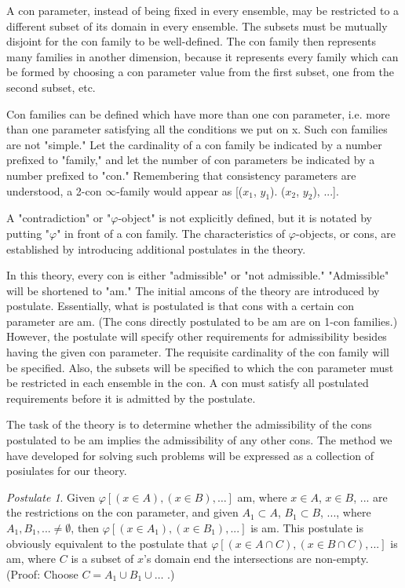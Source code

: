 \documentclass[10pt,twoside,draft]{memoir}
\newcommand{\postulate}[1]{
	\emph{Postulate #1}.}
\begin{document}
{{{{A con parameter, instead of being fixed in every ensemble, may be 
restricted to a different subset of its domain in every ensemble. The subsets 
must be mutually disjoint for the con family to be well-defined. The con 
family then represents many families in another dimension, because it 
represents every family which can be formed by choosing a con parameter 
value from the first subset, one from the second subset, etc. 

Con families can be defined which have more than one con parameter, 
i.e. more than one parameter satisfying all the conditions we put on x. Such 
con families are not "simple." Let the cardinality of a con family be 
indicated by a number prefixed to "family," and let the number of con 
parameters be indicated by a number prefixed to "con." Remembering that 
consistency parameters are understood, a 2-con $\infty$-family would appear as 
[($x_1$, $y_1$). ($x_2$, $y_2$), ...].

A "contradiction" or "$\varphi$-object" is not explicitly defined, but it is 
notated by putting "$\varphi$" in front of a con family. The characteristics of $\varphi$-objects, 
or cons, are established by introducing additional postulates in the 
theory. 

In this theory, every con is either "admissible" or "not admissible." 
"Admissible" will be shortened to "am." The initial amcons of the theory 
are introduced by postulate. Essentially, what is postulated is that cons with 
a certain con parameter are am. (The cons directly postulated to be am are 
on 1-con families.) However, the postulate will specify other requirements for 
admissibility besides having the given con parameter. The requisite 
cardinality of the con family will be specified. Also, the subsets will be 
specified to which the con parameter must be restricted in each ensemble in 
the con. A con must satisfy all postulated requirements before it is admitted 
by the postulate. 

The task of the theory is to determine whether the admissibility of the 
cons postulated to be am implies the admissibility of any other cons. The 
method we have developed for solving such problems will be expressed as a 
collection of posiulates for our theory. 

\postulate{1} Given $\varphi[(x\in A),(x\in B),\ldots]$ am, where $x\in A$, $x\in B$, ... are the 
restrictions on the con parameter, and given $A_1\subset A$, $B_1\subset B$, ..., where $A_1,B_1,...\neq\emptyset$, then 
$\varphi[(x\in A_1),(x\in B_1),...]$ is am. This postulate is obviously 
equivalent to the postulate that $\varphi[(x\in A\cap C),(x\in B\cap C),...]$ is am, where $C$ is 
a subset of $x$'s domain end the intersections are non-empty. (Proof: Choose 
$C=A_1\cup B_1\cup\ldots$ .) 

}}}}
\end{document}
